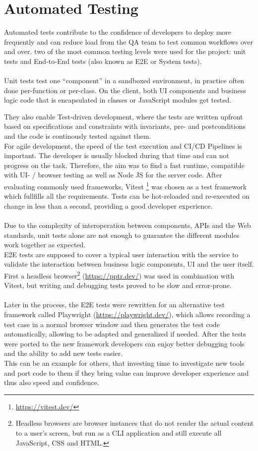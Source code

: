 \section{Automated Testing}
\label{sec:automated-testing}

Automated tests contribute to the confidence of developers to deploy more frequently and can reduce load from the QA team to test common workflows over and over.
two of the most common testing levels were used for the project: unit tests and End-to-End tests (also known as E2E or System tests).
\\\\
Unit tests test one ``component'' in a sandboxed environment, in practice often done per-function or per-class.
On the client, both UI components and business logic code that is encapsulated in classes or JavaScript modules get tested.

They also enable Test-driven development, where the tests are written upfront based on specifications and constraints with invariants, pre- and postconditions and the code is continously tested against them.
\\
For agile development, the speed of the test execution and CI/CD Pipelines is important. The developer is usually blocked during that time and can not progress on the task.
Therefore, the aim was to find a fast runtime, compatible with UI- / browser testing as well as Node JS for the server code.
After evaluating commonly used frameworks, Vitest \footnote{\url{https://vitest.dev/}} was chosen as a test framework which fullfills all the requirements. Tests can be hot-reloaded and re-executed on change in less than a second, providing a good developer experience.
\\\\
Due to the complexity of interoperation between components, APIs and the Web standards, unit tests alone are not enough to guarantee the different modules work together as expected. 
\\
E2E tests are supposed to cover a typical user interaction with the service to validate the interaction between business logic components, UI and the user itself.
First a headless browser\footnote{Headless browsers are browser instances that do not render the actual content to a user's screen, but run as a CLI application and still execute all JavaScript, CSS and HTML.} (\url{https://pptr.dev/}) was used in combination with Vitest,
but writing and debugging tests proved to be slow and error-prone.
\\\\
Later in the process, the E2E tests were rewritten for an alternative test framework called Playwright (\url{https://playwright.dev/}), which allows recording a test case in a normal browser window and then generates the test code automatically, allowing to be adapted and generalized if needed.
After the tests were ported to the new framework developers can enjoy better debugging tools and the ability to add new tests easier.
\\
This can be an example for others, that investing time to investigate new tools and port code to them if they bring value can improve developer experience and thus also speed and confidence.

